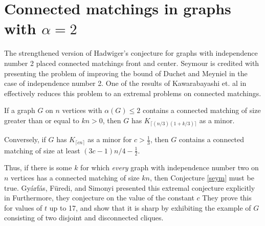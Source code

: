 \section{Connected matchings in graphs with $\alpha = 2$}

The strengthened version of Hadwiger's conjecture for graphs with independence number 2 placed connected matchings front and center.  Seymour is credited with presenting the problem of improving the bound of Duchet and Meyniel in the case of independence number 2.
One of the results of Kawarabayashi et. al in \cite{Kawa} effectively reduces this problem to an extremal problems on connected matchings.
\begin{theorem} If a graph $G$ on $n$ vertices with $\alpha(G) \leq 2$ contains a connected matching of size greater than or equal to $kn>0$, then $G$ has $K_{\lceil (n/3)(1+k/3)\rceil}$ as a minor.

Conversely, if $G$ has $K_{\lceil cn\rceil}$ as a minor for $c> \frac{1}{3}$, then $G$ contains a connected matching of size at least $(3c-1)n/4 -\frac{1}{2}$.\label{ramsey_flavor}
\end{theorem}
Thus, if there is some $k$ for which {\it every} graph with independence number two on $n$ vertices has a connected matching of size $kn$, then Conjecture \ref{seym} must be true.  Gy\'arf\'as, F\"uredi, and Simonyi presented this extremal conjecture explicitly in  \cite{GFS}
Furthermore, they conjecture on the value of the constant $c$
They prove this for values of $t$ up to 17, and show that it is sharp by exhibiting the example of $G$ consisting of two disjoint and disconnected cliques.

